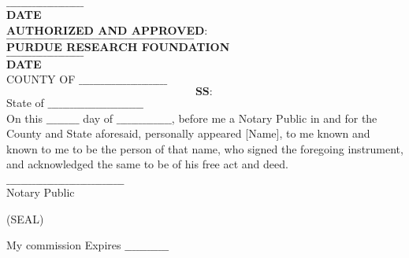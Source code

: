 \noindent$\_\_\_\_\_\_\_\_\_\_\_\_\_\_\_\_\_\_\_\_\_$\\
\textbf{DATE}\\

\noindent \textbf{AUTHORIZED AND APPROVED}:\\
$\_\_\_\_\_\_\_\_\_\_\_\_\_\_\_\_\_\_\_\_\_\_\_\_\_\_\_\_\_\_\_\_\_\_\_\_\_\_\_\_\_\_\_\_\_\_\_\_\_\_\_$\\

\noindent \textbf{PURDUE RESEARCH FOUNDATION}\\
$\_\_\_\_\_\_\_\_\_\_\_\_\_\_\_\_\_\_\_\_\_$\\
\textbf{DATE}\\

\noindent COUNTY OF $\_\_\_\_\_\_\_\_\_\_\_\_\_\_\_\_\_\_\_\_\_\_\_\_$\\
$$\textbf{SS} : $$
State of $\_\_\_\_\_\_\_\_\_\_\_\_\_\_\_\_\_\_\_\_\_\_\_\_\_\_$\\


On this $\_\_\_\_\_\_\_\_\_$ day of $\_\_\_\_\_\_\_\_\_\_\_\_\_\_\_$, before me a Notary Public in and for the County and State aforesaid, personally appeared [Name], to me known and known to me to be the person of that name, who signed the foregoing instrument, and acknowledged the same to be of his free act and deed.

\begin{flushright}
$\_\_\_\_\_\_\_\_\_\_\_\_\_\_\_\_\_\_\_\_\_\_\_\_\_\_\_\_\_\_\_\_$\\
Notary Public
\end{flushright}

(SEAL)

\begin{flushright}
My commission Expires $\_\_\_\_\_\_\_\_\_\_\_\_$
\end{flushright}
